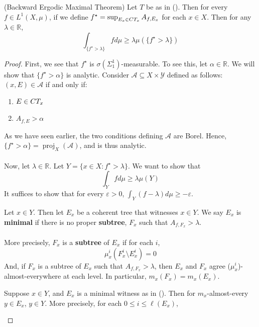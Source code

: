 \documentclass[10pt,a4paper]{amsart}
\DeclareMathOperator{\proj}{proj}
\newcommand{\CT}{\textmd{CT}}
\renewcommand{\ref}[1]{(\oldref{#1})}
\begin{document}
\begin{theorem}
    (Backward Ergodic Maximal Theorem) Let $ T $ be as in \ref{The Theorem}. Then for every $ f\in L^1(X,\mu) $, if we define $ f^\star  = \sup_{E_x\in \CT_x} A_{f,E_x} $ for each $ x\in X $. Then for any $ \lambda\in \mathbb{R} $, 
    \[
    \int_{\{f^\star>\lambda\}} f d\mu \geq \lambda \mu(\{f^\star>\lambda\})
    \]
\end{theorem}

\begin{proof}
    First, we see that $ f^\star $ is $ \sigma(\Sigma^1_1) $-measurable. To see this, let $ \alpha\in \mathbb{R} $. We will show that $ \{f^\star>\alpha\} $ is analytic. Consider $ \mathcal{A}\subseteq X\times \mathcal{Y} $ defined as follows: $ (x,E)\in \mathcal{A} $ if and only if:
    \begin{enumerate}
        \item $ E\in \CT_x $
        \item $ A_{f,E}>\alpha $
    \end{enumerate}
    As we have seen earlier, the two conditions defining $ \mathcal{A} $ are Borel. Hence, $ \{f^\star>\alpha\} = \proj_X(\mathcal{A}) $, and is thus analytic.\\\\
    Now, let $ \lambda\in \mathbb{R} $. Let $ Y = \{x\in X:f^\star>\lambda\} $. We want to show that
    \[
    \int_Y fd\mu \geq \lambda \mu(Y) 
    \]
    It suffices to show that for every $ \varepsilon>0 $, $\int_Y(f-\lambda)d\mu \geq -\varepsilon $.
    \begin{definition}\label{def for min}
        Let $ x\in Y $. Then let $ E_x $ be a coherent tree that witnesses $ x\in Y $. We say $ E_x $ is \textbf{minimal} if there is no proper \textbf{subtree}, $ F_x $ such that $ A_{f,F_x} > \lambda $. \\\\
        More precisely, $ F_x $ is a \textbf{subtree} of $ E_x $ if for each $ i $,
        \[
        \mu^i_x(F_x^i\setminus E_x^i) = 0
        \]
        And, if $ F_x $ is a subtree of $ E_x $ such that $ A_{f,F_x}>\lambda $, then $ E_x $ and $ F_x $ agree ($\mu_x^i$)-almost-everywhere at each level. In particular, $ m_x(F_x) = m_x(E_x) $.
    \end{definition}
    \begin{claim}\label{minimal gives right thing}
        Suppose $ x\in Y $, and $ E_x $ is a minimal witness as in \ref{def for min}. Then for $ m_x $-almost-every $ y\in E_x $, $ y\in Y $. More precisely, for each $ 0\leq i \leq \ell(E_x) $, 

\end{claim}
\end{proof}
\end{document}
